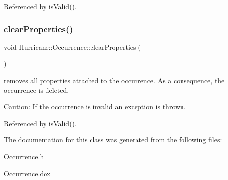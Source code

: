 Referenced by is\+Valid().

\mbox{\label{classHurricane_1_1Occurrence_ae9b269d39f3f68645d6d396d7ab5d8b7}} 
\subsubsection{\texorpdfstring{clear\+Properties()}{clearProperties()}}
{\footnotesize\ttfamily void Hurricane\+::\+Occurrence\+::clear\+Properties (\begin{DoxyParamCaption}{ }\end{DoxyParamCaption})}

removes all properties attached to the occurrence. As a consequence, the occurrence is deleted.

\begin{DoxyParagraph}{Caution\+:}
If the occurrence is invalid an exception is thrown. 
\end{DoxyParagraph}


Referenced by is\+Valid().



The documentation for this class was generated from the following files\+:\begin{DoxyCompactItemize}
\item 
Occurrence.\+h\item 
Occurrence.\+dox\end{DoxyCompactItemize}
